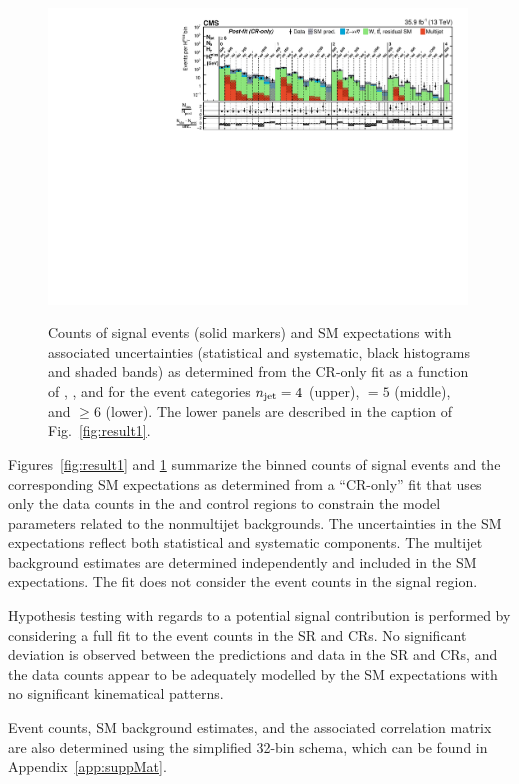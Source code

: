 \begin{figure}[!p]
  \includegraphics[width=0.99\textwidth]{Figures/CMS-SUS-16-038_Figure_002-c.pdf}\\
  \caption{Counts of signal events (solid markers) and SM expectations
    with associated uncertainties (statistical and systematic, black
    histograms and shaded bands) as determined from the CR-only fit as
    a function of \nb, \scalht, and \mht for the event categories
    $n_{\text{jet}} = 4$ (upper), $=5$ (middle), and ${\geq}6$ (lower). The
    lower panels are described in the caption of
    Fig.~\ref{fig:result1}.  }
  \label{fig:result2}
\end{figure}

Figures~\ref{fig:result1} and \ref{fig:result2} summarize the binned
counts of signal events and the corresponding SM expectations as
determined from a ``CR-only'' fit that uses only the data counts in
the \mj and \mmj control regions to constrain the model parameters
related to the nonmultijet backgrounds. The uncertainties in the SM
expectations reflect both statistical and systematic components. The
multijet background estimates are determined independently and
included in the SM expectations. The fit does not consider the event
counts in the signal region.

Hypothesis testing with regards to a potential signal contribution is
performed by considering a full fit to the event counts in the SR and
CRs. No significant deviation is observed between the predictions and
data in the SR and CRs, and the data counts appear to be adequately
modelled by the SM expectations with no significant kinematical
patterns.

Event counts, SM background estimates, and the associated correlation
matrix are also determined using the simplified 32-bin schema, which
can be found in Appendix~\ref{app:suppMat}.

